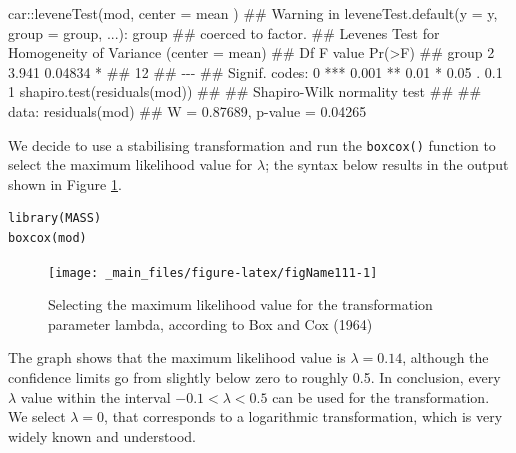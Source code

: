 \documentclass[a4paper,12pt,oneside]{book}
\newenvironment{Shaded}{\begin{snugshade}}{\end{snugshade}}
\newcommand{\SpecialCharTok}[1]{#1}
\newcommand{\DocumentationTok}[1]{#1}
\newcommand{\FunctionTok}[1]{#1}
\newcommand{\AttributeTok}[1]{#1}
\newcommand{\NormalTok}[1]{#1}
\begin{document}
\begin{Shaded}
\begin{Highlighting}[]
\NormalTok{car}\SpecialCharTok{::}\FunctionTok{leveneTest}\NormalTok{(mod, }\AttributeTok{center =}\NormalTok{ mean )}
\DocumentationTok{\#\# Warning in leveneTest.default(y = y, group = group, ...): group}
\DocumentationTok{\#\# coerced to factor.}
\DocumentationTok{\#\# Levene\textquotesingle{}s Test for Homogeneity of Variance (center = mean)}
\DocumentationTok{\#\#       Df F value  Pr(\textgreater{}F)  }
\DocumentationTok{\#\# group  2   3.941 0.04834 *}
\DocumentationTok{\#\#       12                  }
\DocumentationTok{\#\# {-}{-}{-}}
\DocumentationTok{\#\# Signif. codes:  0 \textquotesingle{}***\textquotesingle{} 0.001 \textquotesingle{}**\textquotesingle{} 0.01 \textquotesingle{}*\textquotesingle{} 0.05 \textquotesingle{}.\textquotesingle{} 0.1 \textquotesingle{} \textquotesingle{} 1}
\FunctionTok{shapiro.test}\NormalTok{(}\FunctionTok{residuals}\NormalTok{(mod))}
\DocumentationTok{\#\# }
\DocumentationTok{\#\#  Shapiro{-}Wilk normality test}
\DocumentationTok{\#\# }
\DocumentationTok{\#\# data:  residuals(mod)}
\DocumentationTok{\#\# W = 0.87689, p{-}value = 0.04265}
\end{Highlighting}
\end{Shaded}

We decide to use a stabilising transformation and run the \texttt{boxcox()} function to select the maximum likelihood value for \(\lambda\); the syntax below results in the output shown in Figure \ref{fig:figName111}.

\begin{verbatim}
library(MASS)
boxcox(mod)
\end{verbatim}

\begin{figure}

{\centering \texttt{[image: \_main\_files/figure-latex/figName111-1]} 

}

\caption{Selecting the maximum likelihood value for the transformation parameter lambda, according to Box and Cox (1964)}\label{fig:figName111}
\end{figure}

The graph shows that the maximum likelihood value is \(\lambda = 0.14\), although the confidence limits go from slightly below zero to roughly 0.5. In conclusion, every \(\lambda\) value within the interval \(-0.1 < \lambda < 0.5\) can be used for the transformation. We select \(\lambda = 0\), that corresponds to a logarithmic transformation, which is very widely known and understood.
\end{document}
